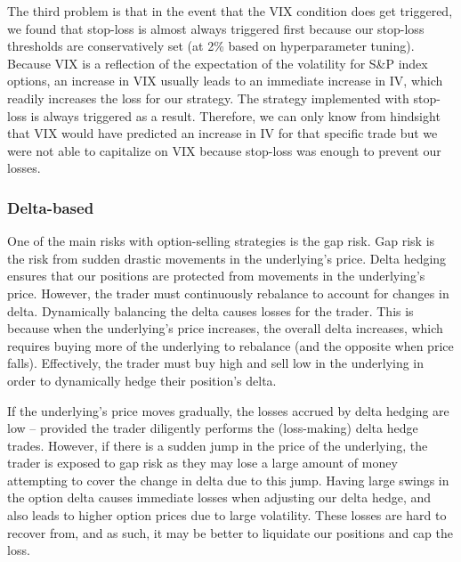 \documentclass[10pt]{article}
\theoremstyle{definition}
\begin{document}
The third problem is that in the event that the VIX condition does get triggered, we found that stop-loss is almost always triggered first because our stop-loss thresholds are conservatively set (at 2\% based on hyperparameter tuning). Because VIX is a reflection of the expectation of the volatility for S\&P index options, an increase in VIX usually leads to an immediate increase in IV, which readily increases the loss for our strategy. The strategy implemented with stop-loss is always triggered as a result. Therefore, we can only know from hindsight that VIX would have predicted an increase in IV for that specific trade but we were not able to capitalize on VIX because stop-loss was enough to prevent our losses.

\subsubsection{Delta-based}
One of the main risks with option-selling strategies is the gap risk. Gap risk is the risk from sudden drastic movements in the underlying's price. Delta hedging ensures that our positions are protected from movements in the underlying's price. However, the trader must continuously rebalance to account for changes in delta. Dynamically balancing the delta causes losses for the trader. This is because when the underlying's price increases, the overall delta increases, which requires buying more of the underlying to rebalance (and the opposite when price falls).  Effectively, the trader must buy high and sell low in the underlying in order to dynamically hedge their position's delta. 

If the underlying's price moves gradually, the losses accrued by delta hedging are low -- provided the trader diligently performs the (loss-making) delta hedge trades. However, if there is a sudden jump in the price of the underlying, the trader is exposed to gap risk as they may lose a large amount of money attempting to cover the change in delta due to this jump. Having large swings in the option delta causes immediate losses when adjusting our delta hedge, and also leads to higher option prices due to large volatility. These losses are hard to recover from, and as such, it may be better to liquidate our positions and cap the loss.
\end{document}
